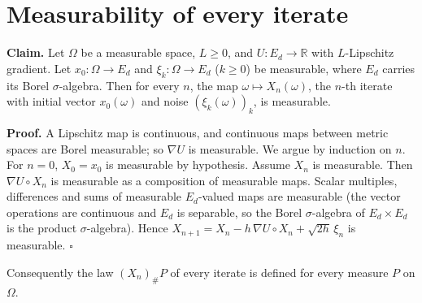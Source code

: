 \documentclass[11pt,a4paper]{article}
\begin{document}
\section{\texorpdfstring{Measurability of every iterate}{Measurability of every iterate}}


\textbf{Claim.} Let \(\Omega\) be a measurable space, \(L\ge0\), and \(U:E_d\to\mathbb R\) with \(L\)-Lipschitz gradient. Let \(x_0:\Omega\to E_d\) and \(\xi_k:\Omega\to E_d\) (\(k\ge0\)) be measurable, where \(E_d\) carries its Borel \(\sigma\)-algebra. Then for every \(n\), the map \(\omega\mapsto X_n(\omega)\), the \(n\)-th iterate with initial vector \(x_0(\omega)\) and noise \((\xi_k(\omega))_k\), is measurable.




\textbf{Proof.} A Lipschitz map is continuous, and continuous maps between metric spaces are Borel measurable; so \(\nabla U\) is measurable. We argue by induction on \(n\). For \(n=0\), \(X_0=x_0\) is measurable by hypothesis. Assume \(X_n\) is measurable. Then \(\nabla U\circ X_n\) is measurable as a composition of measurable maps. Scalar multiples, differences and sums of measurable \(E_d\)-valued maps are measurable (the vector operations are continuous and \(E_d\) is separable, so the Borel \(\sigma\)-algebra of \(E_d\times E_d\) is the product \(\sigma\)-algebra). Hence \(X_{n+1}=X_n-h\,\nabla U\circ X_n+\sqrt{2h}\,\xi_n\) is measurable. \(\square\)




Consequently the law \((X_n)_\#P\) of every iterate is defined for every measure \(P\) on \(\Omega\).
\end{document}
